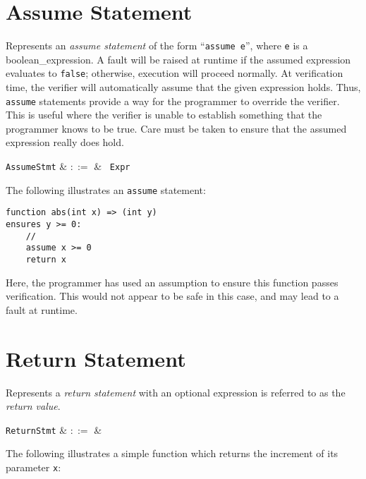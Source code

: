 \section{Assume Statement}

Represents an {\em assume statement} of the form ``\lstinline{assume e}'', where \lstinline{e} is a \gls{boolean_expression}.  A \gls{fault} will be raised at runtime if the assumed expression evaluates to \lstinline{false}; otherwise, execution will proceed normally.  At verification time, the verifier will automatically assume that the given expression holds.  Thus, \lstinline{assume} statements provide a way for the programmer to override the verifier.  This is useful where the verifier is unable to establish something that the programmer knows to be true.  Care must be taken to ensure that the assumed expression really does hold.

\begin{syntax}
  \verb+AssumeStmt+ & $::=$ & \ \verb+Expr+\\
\end{syntax}

\noindent The following illustrates an \lstinline{assume} statement:

\begin{lstlisting}
function abs(int x) => (int y)
ensures y >= 0:
    //
    assume x >= 0
    return x
\end{lstlisting}

Here, the programmer has used an assumption to ensure this function passes verification.  This would not appear to be safe in this case, and may lead to a fault at runtime.


\section{Return Statement}

Represents a {\em return statement} with an optional expression is referred to as the {\em return value}.

\begin{syntax}
  \verb+ReturnStmt+ & $::=$ & \ \\
\end{syntax}

\noindent The following illustrates a simple function
which returns the increment of its parameter \lstinline{x}:

